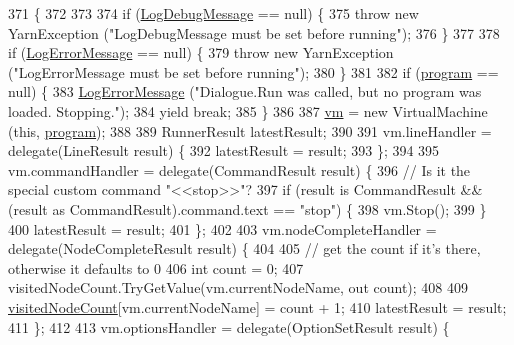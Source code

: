 \begin{DoxyCode}
371                                                                                              \{
372 
373 
374             \textcolor{keywordflow}{if} (\hyperlink{a00072_a381f48bb0fbb294f8cf44ca57f11be31}{LogDebugMessage} == null) \{
375                 \textcolor{keywordflow}{throw} \textcolor{keyword}{new} YarnException (\textcolor{stringliteral}{"LogDebugMessage must be set before running"});
376             \}
377 
378             \textcolor{keywordflow}{if} (\hyperlink{a00072_a9801e83dd044d6498fdf6ebcc6bec5ac}{LogErrorMessage} == null) \{
379                 \textcolor{keywordflow}{throw} \textcolor{keyword}{new} YarnException (\textcolor{stringliteral}{"LogErrorMessage must be set before running"});
380             \}
381 
382             \textcolor{keywordflow}{if} (\hyperlink{a00072_a0a1cca92325f430425d784d416cb5c2b}{program} == null) \{
383                 \hyperlink{a00072_a9801e83dd044d6498fdf6ebcc6bec5ac}{LogErrorMessage} (\textcolor{stringliteral}{"Dialogue.Run was called, but no program was loaded.
       Stopping."});
384                 yield \textcolor{keywordflow}{break};
385             \}
386 
387             \hyperlink{a00072_a8c1319357a9df6cff051328fb33224c7}{vm} = \textcolor{keyword}{new} VirtualMachine (\textcolor{keyword}{this}, \hyperlink{a00072_a0a1cca92325f430425d784d416cb5c2b}{program});
388 
389             RunnerResult latestResult;
390 
391             vm.lineHandler = delegate(LineResult result) \{
392                 latestResult = result;
393             \};
394 
395             vm.commandHandler = delegate(CommandResult result) \{
396                 \textcolor{comment}{// Is it the special custom command "<<stop>>"?}
397                 \textcolor{keywordflow}{if} (result is CommandResult && (result as CommandResult).command.text == \textcolor{stringliteral}{"stop"}) \{
398                     vm.Stop();
399                 \}
400                 latestResult = result;
401             \};
402 
403             vm.nodeCompleteHandler = delegate(NodeCompleteResult result) \{
404 
405                 \textcolor{comment}{// get the count if it's there, otherwise it defaults to 0}
406                 \textcolor{keywordtype}{int} count = 0;
407                 visitedNodeCount.TryGetValue(vm.currentNodeName, out count);
408 
409                 \hyperlink{a00072_aae9e64354066a1e2fa130629959d772b}{visitedNodeCount}[vm.currentNodeName] = count + 1;
410                 latestResult = result;
411             \};
412 
413             vm.optionsHandler = delegate(OptionSetResult result) \{

\end{DoxyCode}
